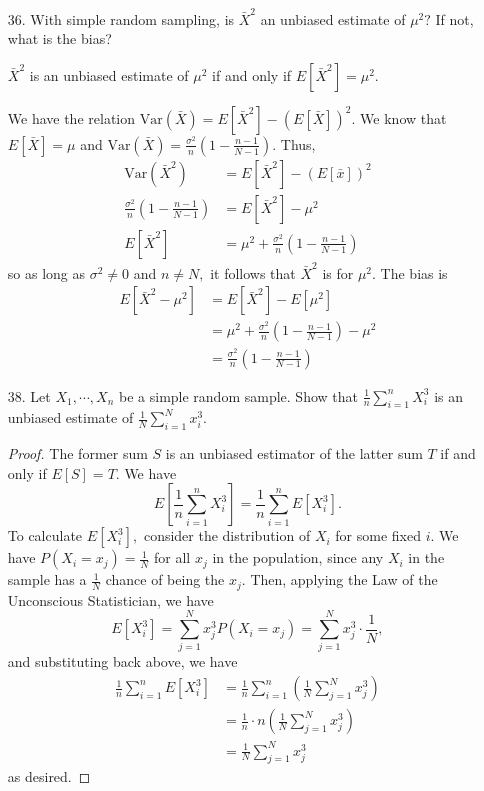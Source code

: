 \documentclass{article}
\newcommand{\var}{\mathrm{Var}}
\begin{document}
\begin{itemize}
\begin{enumerate}[a.]
\begin{soln}
			\end{soln}
			
		\end{enumerate}

	
	\item[36.] With simple random sampling, is $\bar{X}^2$ an unbiased estimate of $\mu^2?$ If not, what is the bias?
		\begin{soln}
			$\bar{X}^2$ is an unbiased estimate of $\mu^2$ if and only if $E[\bar{X}^2] = \mu^2.$ 
		
			We have the relation $\var(\bar{X}) = E[\bar{X}^2] - (E[\bar{X}])^2.$ We know that $E[\bar{X}]=\mu$ and $\var(\bar{X})=\displaystyle\frac{\sigma^2}{n}\left( 1-\frac{n-1}{N-1} \right).$ Thus, 
			\begin{align*}
				\var(\bar{X}^2) &= E[\bar{X}^2] - (E[\bar{x}])^2 \\
				\frac{\sigma^2}{n}\left( 1-\frac{n-1}{N-1} \right) &= E[\bar{X}^2] - \mu^2 \\
				E[\bar{X}^2] &= \mu^2+\frac{\sigma^2}{n}\left( 1-\frac{n-1}{N-1} \right)
			\end{align*} so as long as $\sigma^2\neq 0$ and $n\neq N,$ it follows that $\bar{X}^2$ is  for $\mu^2.$ The bias is
			\begin{align*}
				E[\bar{X}^2-\mu^2] &= E[\bar{X}^2]-E[\mu^2] \\
				&= \mu^2+\frac{\sigma^2}{n}\left( 1-\frac{n-1}{N-1} \right) - \mu^2 \\
				&= \boxed{\frac{\sigma^2}{n}\left( 1-\frac{n-1}{N-1} \right)}
			\end{align*}
			
		\end{soln}
		

	\item[38.] Let $X_1, \cdots, X_n$ be a simple random sample. Show that $\displaystyle\frac{1}{n}\sum_{i=1}^n X_i^3$ is an unbiased estimate of $\displaystyle\frac{1}{N}\sum_{i=1}^N x_i^3.$
		\begin{proof}
			The former sum $S$ is an unbiased estimator of the latter sum $T$ if and only if $E[S]=T.$ We have \[E\left[ \frac{1}{n}\sum_{i=1}^n X_i^3\right] = \frac{1}{n}\sum_{i=1}^n E[X_i^3].\] To calculate $E[X_i^3],$ consider the distribution of $X_i$ for some fixed $i.$ We have $P(X_i = x_j)=\frac{1}{N}$ for all $x_j$ in the population, since any $X_i$ in the sample has a $\frac{1}{N}$ chance of being the $x_j.$ Then, applying the Law of the Unconscious Statistician, we have \[E[X_i^3]=\sum_{j=1}^N x_j^3P(X_i = x_j) = \sum_{j=1}^N x_j^3\cdot\frac{1}{N}, \] and substituting back above, we have
			\begin{align*}
				\frac{1}{n}\sum_{i=1}^n E[X_i^3] &= \frac{1}{n}\sum_{i=1}^n \left( \frac{1}{N}\sum_{j=1}^N x_j^3 \right) \\
				&= \frac{1}{n}\cdot n\left( \frac{1}{N}\sum_{j=1}^N x_j^3 \right) \\
				&= \frac{1}{N} \sum_{j=1}^N x_j^3
			\end{align*} as desired.
			
		\end{proof}
		
\end{itemize}
\end{document}

